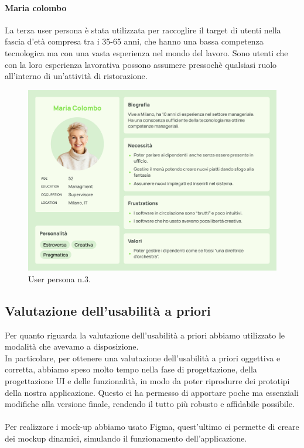\paragraph{Maria colombo}
La terza user persona è stata utilizzata per raccoglire il target di utenti nella fascia d'età compresa tra i 35-65 anni, che hanno una bassa competenza tecnologica ma con una vasta esperienza nel mondo del lavoro. Sono utenti che con la loro esperienza lavorativa possono assumere pressochè qualsiasi ruolo all'interno di un'attività di ristorazione.

\begin{figure}[H]
  \centering
  \includegraphics[scale=0.25]{img/personas/Maria_colombo_persona.png}
  \caption{User persona n.3.}
\end{figure}\newpage
\subsection{Valutazione dell'usabilità a priori}

Per quanto riguarda la valutazione dell'usabilità a priori abbiamo utilizzato le modalità che avevamo a disposizione. \\
In particolare, per ottenere una valutazione dell'usabilità a priori oggettiva e corretta, abbiamo speso molto tempo nella fase di progettazione,  della progettazione UI
e delle funzionalità, in modo da poter riprodurre dei prototipi della nostra applicazione. Questo ci ha permesso di apportare poche ma essenziali modifiche alla versione finale, rendendo il tutto più robusto e affidabile possibile.
\\
\\
Per realizzare i mock-up abbiamo usato Figma, quest'ultimo ci permette di
creare dei mockup dinamici, simulando il funzionamento dell'applicazione.
